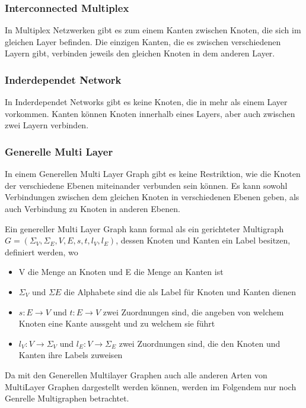 \subsubsection{Interconnected Multiplex}

In Multiplex Netzwerken gibt es zum einem Kanten zwischen Knoten, die sich im gleichen Layer befinden. Die einzigen Kanten, die es zwischen verschiedenen Layern gibt, verbinden jeweils den gleichen Knoten in dem anderen Layer. 

\subsubsection{Inderdependet Network}

In Inderdependet Networks gibt es keine Knoten, die in mehr als einem Layer vorkommen. Kanten können Knoten innerhalb eines Layers, aber auch zwischen zwei Layern verbinden.

\subsubsection{Generelle Multi Layer}
In einem Generellen Multi Layer Graph gibt es keine Restriktion, wie die Knoten der verschiedene Ebenen miteinander verbunden sein können. Es kann sowohl Verbindungen zwischen dem gleichen Knoten in verschiedenen Ebenen geben, als auch Verbindung zu Knoten in anderen Ebenen.


Ein genereller Multi Layer Graph kann formal als ein gerichteter Multigraph\cite{article} $G = (\Sigma_{V}, \Sigma_{E}, V, E, s, t, l_{V}, l_{E})$, dessen Knoten und Kanten ein Label besitzen, definiert werden, wo

\begin{itemize}
  \item V die Menge an Knoten und E die Menge an Kanten ist
  \item $\Sigma_{V}$ und $\Sigma{E}$ die Alphabete sind die als Label für Knoten und Kanten dienen
  \item $s: E \rightarrow V$ und $t: E \rightarrow V$ zwei Zuordnungen sind, die angeben von welchem Knoten eine Kante aussgeht und zu welchem sie führt
  \item $l_{V}: V \rightarrow \Sigma_{V}$ und $l_{E}: V \rightarrow \Sigma_{E}$ zwei Zuordnungen sind, die den Knoten und Kanten ihre Labels zuweisen
\end{itemize}

Da mit den Generellen Multilayer Graphen auch alle anderen Arten von MultiLayer Graphen dargestellt werden können, werden im Folgendem nur noch Genrelle Multigraphen betrachtet.
